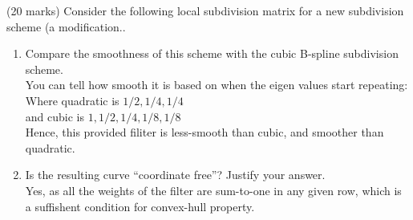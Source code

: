 (20 marks) Consider the following local subdivision matrix for a new subdivision scheme (a modification.. \\

\begin{enumerate}
\item Compare the smoothness of this scheme with the cubic B-spline subdivision scheme. \\
You can tell how smooth it is based on when the eigen values start repeating: \\
Where quadratic is $1/2, 1/4, 1/4$ \\
and cubic is $1, 1/2, 1/4, 1/8, 1/8$ \\
Hence, this provided filiter is less-smooth than cubic, and smoother than quadratic. \\
\item Is the resulting curve ``coordinate free''? Justify your answer. \\
Yes, as all the weights of the filter are sum-to-one in any given row, which is a suffishent condition for convex-hull property. \\
\end{enumerate}
